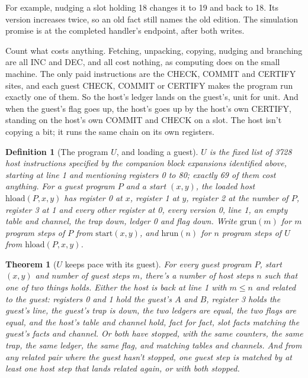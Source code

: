 \documentclass[11pt,twoside]{article}
\theoremstyle{thielethm}
\newtheorem{theorem}{Theorem}[section]
\theoremstyle{thieledef}
\newtheorem{definition}{Definition}[section]
\theoremstyle{thieledef}
\theoremstyle{thieledef}
\theoremstyle{thielethm}
\theoremstyle{thieleobs}
\theoremstyle{thielethm}
\begin{document}
For example, nudging a slot holding 18 changes it to 19 and back to 18. Its version
increases twice, so an old fact still names the old edition. The simulation promise
is at the completed handler's endpoint, after both writes.

Count what costs anything. Fetching, unpacking, copying, nudging and branching are all INC and DEC,
and all cost nothing, as computing does on the small machine. The only paid instructions are the
CHECK, COMMIT and CERTIFY sites, and each guest CHECK, COMMIT or CERTIFY makes the program run
exactly one of them. So the host's ledger lands on the guest's, unit for unit. And when the guest's
flag goes up, the host's goes up by the host's own CERTIFY, standing on the host's own COMMIT and
CHECK on a slot. The host isn't copying a bit; it runs the same chain on its own registers.

\begin{definition}[The program $U$, and loading a guest]\label{def:u34-U}
$U$ is the fixed list of 3728 host instructions specified by the companion block
expansions identified above,
starting at line 1 and
mentioning registers 0 to 80; exactly 69 of them cost anything. For a guest program $P$ and a
start $(x, y)$, the \emph{loaded host} $\mathrm{hload}(P, x, y)$ has register 0 at $x$, register 1
at $y$, register 2 at the number of $P$, register 3 at 1 and every other register at 0, every
version 0, line 1, an empty table and channel, the trap down, ledger 0 and flag down. Write
$\mathrm{grun}(m)$ for $m$ program steps of $P$ from $\mathrm{start}(x, y)$, and
$\mathrm{hrun}(n)$ for $n$ program steps of $U$ from $\mathrm{hload}(P, x, y)$.
\end{definition}

\begin{theorem}[$U$ keeps pace with its guest]\label{thm:u34-U-sim}
For every guest program $P$, start $(x, y)$ and number of guest steps $m$, there's a number of
host steps $n$ such that one of two things holds. Either the host is back at line 1 with
$m \le n$ and \emph{related} to the guest: registers 0 and 1 hold the guest's $A$ and $B$,
register 3 holds the guest's line, the guest's trap is down, the two ledgers are equal, the two flags
are equal, and the host's table and channel hold, fact for fact, slot facts matching the guest's
facts and channel. Or both have stopped, with the same counters, the same trap, the same ledger,
the same flag, and matching tables and channels. And from any related pair where the guest hasn't
stopped, one guest step is matched by at least one host step that lands related again, or with
both stopped.
\end{theorem}
\end{document}
